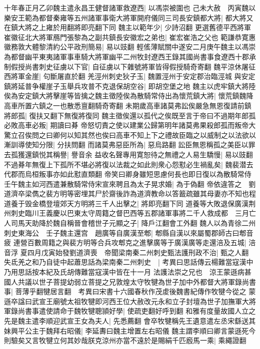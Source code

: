 十年春正月乙卯魏主遣永昌王健督諸軍救遼西|{
	以馮崇被圍也}
己未大赦　丙寅魏以樂安王範為都督秦雍等五州諸軍事衛大將軍開府儀同三司長安鎮都大將|{
	都大將又在鎮大將之上雍於用翻將即亮翻下同}
魏主以範年少|{
	少詩沼翻}
更選舊德平西將軍崔徽征北大將軍鴈門張黎為之副共鎮長安徽宏之弟也|{
	崔宏崔浩之父也}
範謙恭寛惠徽務敦大體黎清約公平政刑簡易|{
	易以豉翻}
輕傜薄賦關中遂安二月庚午魏主以馮崇為都督幽平東夷諸軍事車騎大將軍幽平二州牧封遼西王錄其國尚書事食遼西十郡承制假授尚書刺史征虜以下官|{
	自征虜以下雜號將軍皆得假授騎奇寄翻}
魏平涼休屠征西將軍金崖|{
	句斷屠直於翻}
羌涇州刺史狄子玉|{
	魏置涇州于安定郡治臨涇城}
與安定鎮將延普争權崖子玉舉兵攻普不克退保胡空谷|{
	即胡空堡之地}
魏主以虎牢鎮大將陸俟為安定鎮大將擊崖等皆擒之魏主徵陸俟為散騎常侍出為懷荒鎮大將|{
	懷荒鎮魏降高車所置六鎮之一也散悉亶翻騎奇寄翻}
未期歲高車諸莫弗訟俟嚴急無恩復請前鎮將郎孤|{
	復扶又翻下無復將復同}
魏主徵俟還以孤代之俟既至言于帝曰不過期年郎孤必敗高車必叛|{
	期讀曰朞}
帝怒切責之使以建業公歸第明年諸莫弗果殺郎孤而叛帝大驚立召俟問之曰卿何以知其然也俟曰高車不知上下之禮故臣臨之以威制之以法欲以漸訓導使知分限|{
	分扶問翻}
而諸莫弗惡臣所為|{
	惡烏路翻}
訟臣無恩稱孤之美臣以罪去孤獲還鎮悦其稱譽|{
	譽音余}
益收名聲專用寛恕待之無禮之人易生驕慢|{
	易以豉翻}
不過朞年無復上下孤所不堪必將復以法裁之如此則衆心怨懟必生禍亂矣|{
	魏裴潜去代郡而烏桓叛事亦如此懟直類翻}
帝笑曰卿身雖短思慮何長也即日復以為散騎常侍　壬午魏主如河西遣兼散騎常侍宋宣來聘且為太子晃求婚|{
	為于偽翻}
帝依違答之　劉道濟卒梁儁之裴方明等密埋其尸於齋後詐為道濟教命以答籖疏雖其母妻亦不知也程道養于毁金橋登壇郊天方明將三千人出擊之|{
	將即亮翻下同}
道養等大敗退保廣漢荆州刺史臨川王義慶以巴東太守周籍之督巴西等五郡諸軍事將二千人救成都　三月亡人司馬天助降於魏自稱晉會稽世子元顯之子|{
	降戶江翻會工外翻}
魏人以為青徐二州刺史東海公　壬子魏主還宫　趙廣等自廣漢至郫|{
	郫縣自漢以來屬蜀郡師古曰郫音疲}
連營百數周籍之與裴方明等合兵攻郫克之進擊廣等于廣漢廣等走還涪及五城|{
	涪音浮}
夏四月戊寅始發劉道濟喪　帝聞梁南秦二州刺史甄法護刑政不治|{
	甄之人翻}
失氐羌之和乃自徒中起蕭思話為梁南秦二州刺史　|{
	考異曰思話傳云楊難當寇漢中乃用思話按本紀及氏胡傳難當寇漢中皆在十一月}
法護法崇之兄也　涼王蒙遜病甚國人共議以世子菩提幼弱立菩提之兄敦煌太守牧犍為世子加中外都督大將軍錄尚書事|{
	菩薄乎翻犍居言翻　考異曰宋書十六國春秋作茂䖍後魏書紀傳作牧犍今從之}
蒙遜卒諡曰武宣王廟號太祖牧犍即河西王位大赦改元永和立子封壇為世子加撫軍大將軍錄尚書事遣使請命于魏牧犍聰頴好學|{
	使疏吏翻好呼到翻}
和雅有度量故國人立之先是魏主遣李順迎武宣王女為夫人|{
	先悉薦翻}
會卒牧犍稱先王遺意遣左丞宋繇送其妹興平公主于魏拜右昭儀|{
	李延夀曰魏主增置左右昭儀}
魏主謂李順曰卿言蒙遜死今則驗矣又言牧犍立何其妙哉朕克涼州亦當不遠於是賜絹千匹廏馬一乘|{
	乘繩證翻}
